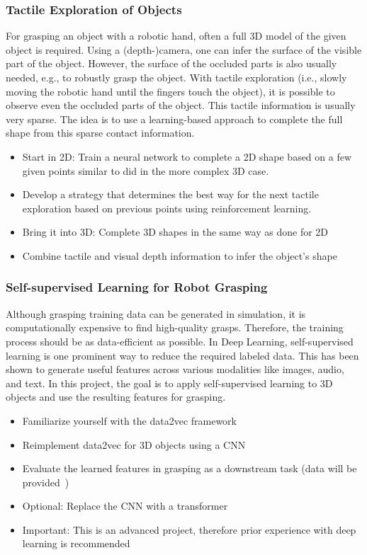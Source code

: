 \documentclass[a4paper]{article}
\begin{document}
\subsubsection{Tactile Exploration of Objects}
For grasping an object with a robotic hand, often a full 3D model of the given object is required.
Using a (depth-)camera, one can infer the surface of the visible part of the object. However, the surface of the occluded parts is also usually needed, e.g., to robustly grasp the object.
With tactile exploration (i.e., slowly moving the robotic hand until the fingers touch the object), it is possible to observe even the occluded parts of the object.
This tactile information is usually very sparse. The idea is to use a learning-based approach to complete the full shape from this sparse contact information.

\begin{itemize}
  \item Start in 2D: Train a neural network to complete a 2D shape based on a few given points similar to \citet{watkins2019multi} did in the more complex 3D case.
  \item Develop a strategy that determines the best way for the next tactile exploration based on previous points using reinforcement learning.
  \item Bring it into 3D: Complete 3D shapes in the same way as done for 2D
  \item Combine tactile and visual depth information to infer the object's shape
\end{itemize}


\subsubsection{Self-supervised Learning for Robot Grasping}
Although grasping training data can be generated in simulation, it is computationally expensive to find high-quality grasps.
Therefore, the training process should be as data-efficient as possible.
In Deep Learning, self-supervised learning is one prominent way to reduce the required labeled data.
This has been shown to generate useful features across various modalities like images, audio, and text.
In this project, the goal is to apply self-supervised learning to 3D objects and use the resulting features for grasping.
\begin{itemize}
  \item Familiarize yourself with the data2vec framework~\cite{baevski2022data2vec}
  \item Reimplement data2vec for 3D objects using a CNN
  \item Evaluate the learned features in grasping as a downstream task (data will be provided~\cite{winkelbauer2022})
  \item Optional: Replace the CNN with a transformer
  \item Important: This is an advanced project, therefore prior experience with deep learning is recommended
\end{itemize}
\end{document}
